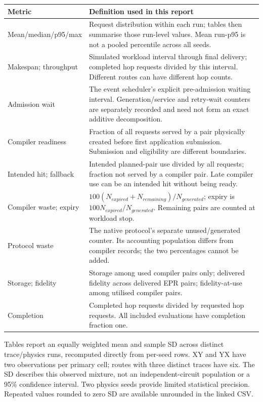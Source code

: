 \documentclass[10pt,a4paper,oneside]{report}
\begin{document}
\begin{center}\small
\begin{tabular}{p{.27\linewidth}p{.63\linewidth}}\toprule
Metric & Definition used in this report\\\midrule
Mean/median/p95/max & Request distribution within each run; tables then summarise those run-level values. Mean run-p95 is not a pooled percentile across all seeds.\\
Makespan; throughput & Simulated workload interval through final delivery; completed hop requests divided by this interval. Different routes can have different hop counts.\\
Admission wait & The event scheduler's explicit pre-admission waiting interval. Generation/service and retry-wait counters are separately recorded and need not form an exact additive decomposition.\\
Compiler readiness & Fraction of all requests served by a pair physically created before first application submission. Submission and eligibility are different boundaries.\\
Intended hit; fallback & Intended planned-pair use divided by all requests; fraction not served by a compiler pair. Late compiler use can be an intended hit without being ready.\\
Compiler waste; expiry & $100(N_{expired}+N_{remaining})/N_{generated}$; expiry is $100N_{expired}/N_{generated}$. Remaining pairs are counted at workload stop.\\
Protocol waste & The native protocol's separate unused/generated counter. Its accounting population differs from compiler records; the two percentages cannot be added.\\
Storage; fidelity & Storage among used compiler pairs only; delivered fidelity across delivered EPR pairs; fidelity-at-use among utilised compiler pairs.\\
Completion & Completed hop requests divided by requested hop requests. All included evaluations have completion fraction one.\\\bottomrule
\end{tabular}\end{center}

Tables report an equally weighted mean and sample SD across distinct trace/physics runs, recomputed directly from per-seed rows. XY and YX have two observations per primary cell; routes with three distinct traces have six. The SD describes this observed mixture, not an independent-circuit population or a 95\% confidence interval. Two physics seeds provide limited statistical precision. Repeated values rounded to zero SD are available unrounded in the linked CSV.
\end{document}
